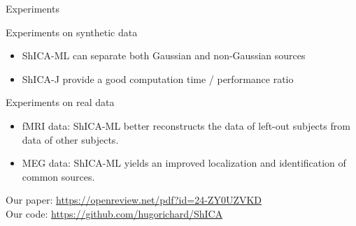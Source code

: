 \documentclass[bigger]{beamer}
\begin{document}
\begin{frame}{Experiments}
  \begin{block}{Experiments on synthetic data}
    \begin{itemize}
    \item ShICA-ML can separate both Gaussian and non-Gaussian sources
    \item ShICA-J provide a good computation time / performance ratio
   \end{itemize}
  \end{block}
  \begin{block}{Experiments on real data}
    \begin{itemize}
    \item fMRI data: ShICA-ML better reconstructs the data of left-out subjects
      from data of other subjects.
    \item MEG data: ShICA-ML yields an improved localization and identification
      of common sources.
    \end{itemize}
  \end{block}

  Our paper: {\color{blue} \url{https://openreview.net/pdf?id=24-ZY0UZVKD}} \\
  Our code: {\color{blue} \url{https://github.com/hugorichard/ShICA}}
  
\end{frame}
\end{document}
